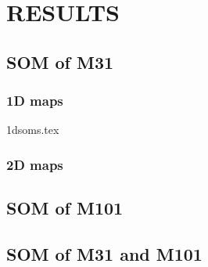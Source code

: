 \section{RESULTS}
   \subsection{SOM of M31}
        \subsubsection{1D maps}
            {1dsoms.tex}
        \subsubsection{2D maps}
   \subsection{SOM of M101}
   \subsection{SOM of M31 and M101}